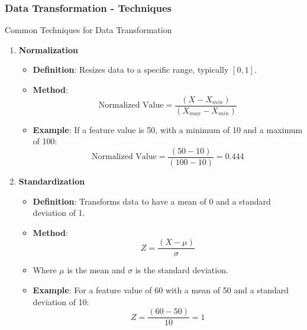 \documentclass[aspectratio=169]{beamer}
\begin{document}
\begin{frame}[fragile]
    \frametitle{Data Transformation - Techniques}
    \begin{block}{Common Techniques for Data Transformation}
        \begin{enumerate}
            \item \textbf{Normalization}
            \begin{itemize}
                \item \textbf{Definition}: Resizes data to a specific range, typically \([0, 1]\).
                \item \textbf{Method}:
                \begin{equation}
                    \text{Normalized Value} = \frac{(X - X_{min})}{(X_{max} - X_{min})}
                \end{equation}
                \item \textbf{Example}: 
                If a feature value is 50, with a minimum of 10 and a maximum of 100:
                \begin{equation}
                    \text{Normalized Value} = \frac{(50 - 10)}{(100 - 10)} = 0.444
                \end{equation}
            \end{itemize}
            \item \textbf{Standardization}
            \begin{itemize}
                \item \textbf{Definition}: Transforms data to have a mean of 0 and a standard deviation of 1.
                \item \textbf{Method}:
                \begin{equation}
                    Z = \frac{(X - \mu)}{\sigma}
                \end{equation}
                \item Where \(\mu\) is the mean and \(\sigma\) is the standard deviation.
                \item \textbf{Example}:
                For a feature value of 60 with a mean of 50 and a standard deviation of 10:
                \begin{equation}
                    Z = \frac{(60 - 50)}{10} = 1
                \end{equation}
            \end{itemize}
        \end{enumerate}
    \end{block}
\end{frame}
\end{document}
